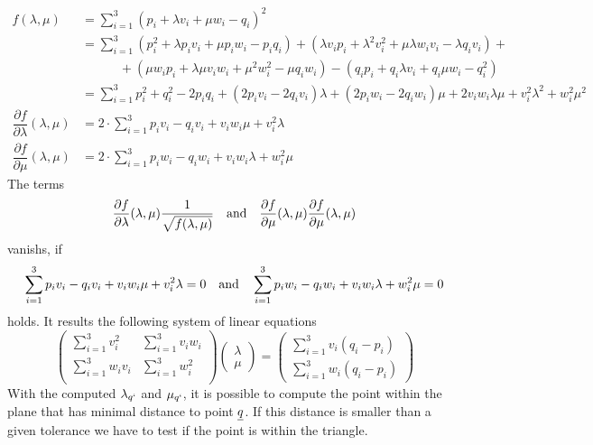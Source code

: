\begin{align*}
f(\lambda, \mu)
	&= \sum_{i=1}^3 \left(p_i + \lambda v_i + \mu w_i - q_i\right)^2 \nonumber
	\\
	&= \sum_{i=1}^3 \left( p_i^2 + \lambda p_i v_i + \mu p_i w_i - p_i q_i
	\right) +
	\left(\lambda v_i p_i + \lambda^2 v_i^2 + \mu \lambda w_i v_i -
		\lambda q_i v_i \right) + \nonumber \\
	&\qquad \quad  + \left(\mu w_i p_i + \lambda \mu v_i w_i + \mu^2 w_i^2 -
		\mu q_i w_i \right) -
	\left(q_i p_i + q_i \lambda v_i + q_i \mu w_i - q_i^2 \right)
	\nonumber \\
	&= \sum_{i=1}^3 p_i^2 + q_i^2 - 2 p_i q_i
		+ \left(2 p_i v_i - 2 q_i v_i\right) \lambda
		+ \left(2 p_i w_i - 2 q_i w_i\right) \mu
		+ 2 v_i w_i \lambda \mu
		+ v_i^2 \lambda^2
		+ w_i^2 \mu^2 \\
\dfrac{\partial f}{\partial \lambda}(\lambda, \mu)
	&= 2 \cdot \sum_{i=1}^3 p_i v_i - q_i v_i + v_i w_i \mu + v_i^2 \lambda\\
\dfrac{\partial f}{\partial \mu}(\lambda, \mu)
	&= 2 \cdot \sum_{i=1}^3 p_i w_i - q_i w_i + v_i w_i \lambda + w_i^2 \mu
\end{align*}
The terms
\begin{equation*}
\dfrac{\partial f}{\partial \lambda}(\lambda, \mu)
	\dfrac{1}{\sqrt{f(\lambda, \mu)}}
\quad \textnormal{and} \quad
\dfrac{\partial f}{\partial \mu}(\lambda, \mu)
	\dfrac{\partial f}{\partial \mu}(\lambda, \mu)
\end{equation*}
vanishs, if
\begin{equation*}
\sum_{i=1}^3 p_i v_i - q_i v_i + v_i w_i \mu + v_i^2 \lambda = 0
\quad \textnormal{and} \quad
\sum_{i=1}^3 p_i w_i - q_i w_i + v_i w_i \lambda + w_i^2 \mu = 0
\end{equation*}
holds. It results the following system of linear equations
\begin{equation*}
\begin{pmatrix}
\sum_{i=1}^3 v_i^2 & \sum_{i=1}^3 v_i w_i \\
\sum_{i=1}^3 w_i v_i & \sum_{i=1}^3 w_i^2 \\
\end{pmatrix}
\begin{pmatrix}
\lambda \\ \mu
\end{pmatrix}
=
\begin{pmatrix}
\sum_{i=1}^3 v_i (q_i - p_i) \\
\sum_{i=1}^3 w_i (q_i - p_i)
\end{pmatrix}
\end{equation*}
With the computed $\lambda_{q`}$ and $\mu_{q`}$, it is possible to compute
the point within the plane that has minimal distance to point $\vq$. If
this distance is smaller than a given tolerance we have to test if the point
is within the triangle.

